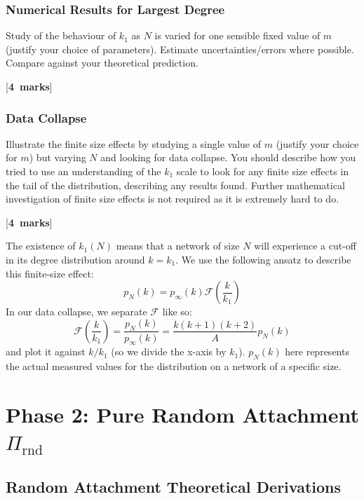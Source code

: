 \documentclass[a4paper,12pt]{article}
\newcounter{nmarks}
\newcommand{\qmarks}[1]{\addtocounter{nmarks}{#1} }
\renewcommand{\qmarks}[1]{\addtocounter{nmarks}{#1} \hspace*{\fill} [\textbf{#1~marks}]}
\begin{document}
\subsubsection{Numerical Results for Largest Degree}
Study of the behaviour of $k_1$ as $N$ is varied for one sensible fixed value of $m$ (justify your choice of parameters). Estimate uncertainties/errors where possible. Compare against your theoretical prediction. \qmarks{4}

\subsubsection{Data Collapse}
Illustrate the finite size effects by studying a single value of $m$ (justify your choice for $m$) but varying $N$ and looking for data collapse. You should describe how you tried to use an understanding of the $k_1$ scale to look for any finite size effects in the tail of the distribution, describing any results found. Further mathematical investigation of finite size effects is not required as it is extremely hard to do. \qmarks{4}

The existence of $k_1(N)$ means that a network of size $N$ will experience a cut-off in its degree distribution around $k=k_1$. We use the following ansatz to describe this finite-size effect:
\begin{equation} \label{FiniteSizeAnsatz}
p_N(k)=p_\infty(k)\mathcal{F}\left(\frac{k}{k_1}\right)
\end{equation}
In our data collapse, we separate $\mathcal{F}$ like so:
$$\mathcal{F}\left(\frac{k}{k_1}\right)=\frac{p_N(k)}{p_\infty(k)}=\frac{k(k+1)(k+2)}{A}p_N(k)$$
and plot it against $k/k_1$ (so we divide the x-axis by $k_1$). $p_N(k)$ here represents the actual measured values for the distribution on a network of a specific size.


\section{Phase 2: Pure Random Attachment $\Pi_\mathrm{rnd}$}



\subsection{Random Attachment Theoretical Derivations}
\end{document}
